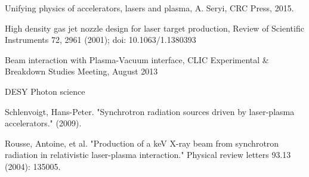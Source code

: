 \documentclass[a4paper,
              ]{jacow}
\begin{document}
\begin{thebibliography}{99}
 Unifying physics of accelerators, lasers and plasma, A. Seryi, CRC Press, 2015.

 High density gas jet nozzle design for laser target production, Review of Scientific Instruments 72, 2961 (2001); doi: 10.1063/1.1380393

Beam interaction with Plasma-Vacuum interface, CLIC Experimental \& Breakdown Studies Meeting, August 2013 

 DESY Photon science


 Schlenvoigt, Hans-Peter. "Synchrotron radiation sources driven by laser-plasma accelerators." (2009). 

 Rousse, Antoine, et al. "Production of a keV X-ray beam from synchrotron radiation in relativistic laser-plasma interaction." Physical review letters 93.13 (2004): 135005.



\end{thebibliography}
\end{document}
